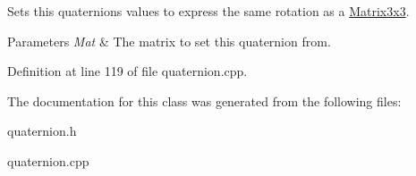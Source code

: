 Sets this quaternions values to express the same rotation as a \hyperlink{classMezzanine_1_1Matrix3x3}{Matrix3x3}. 


\begin{DoxyParams}{Parameters}
{\em Mat} & The matrix to set this quaternion from. \\
\hline
\end{DoxyParams}


Definition at line 119 of file quaternion.cpp.



The documentation for this class was generated from the following files:\begin{DoxyCompactItemize}
\item 
quaternion.h\item 
quaternion.cpp\end{DoxyCompactItemize}
